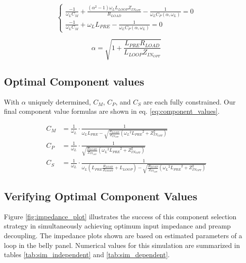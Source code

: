 \begin{equation}\label{eq:syseq}
\begin{cases}
    \frac{-1}{\omega_L C_M} + \frac{(\alpha^2-1) \omega_L L_{LOOP} Z_{IN_{OPT}}}{R_{LOAD}} - \frac{1}{\omega_L
    C_P(\alpha,\omega_L)} = 0\\

    \frac{-1}{\omega_L C_M} + \omega_L L_{PRE} - \frac{1}{\omega_L C_P(\alpha, \omega_L)} = 0 

\end{cases}
\end{equation}

\begin{equation}\label{eq:alpha}
    \alpha = \sqrt{1 + \frac{L_{PRE} R_{LOAD}}{L_{LOOP} Z_{IN_{OPT}}}}
\end{equation}

\subsection{Optimal Component values}
With $\alpha$ uniquely determined, $C_M$, $C_P$, and $C_S$ are each fully constrained. Our final component value formulas
are shown in eq. \ref{eq:component_values}.

\begin{equation}\label{eq:component_values}
\begin{aligned}
        C_M &= \frac{1}{\omega_L} \cdot \frac{1}{\omega_L L_{PRE} - \sqrt{\frac{R_{LOAD}}{Z_{IN_{OPT}}} ({\omega_L}^2 {L_{PRE}}^2 + Z_{IN_{OPT}}^2)}}\\
        C_P &= \frac{1}{\omega_L} \cdot \frac{1}{\sqrt{\frac{R_{LOAD}}{Z_{IN_{OPT}}} ({\omega_L}^2 {L_{PRE}}^2 + Z_{IN_{OPT}}^2)}}\\
        C_S &= \frac{1}{\omega_L} \cdot \frac{1}{\omega_L(L_{PRE} \frac{R_{LOAD}}{Z_{IN{OPT}}} + L_{LOOP}) - \sqrt{\frac{R_{LOAD}}{Z_{IN_{OPT}}} ({\omega_L}^2 {L_{PRE}}^2 + Z_{IN_{OPT}}^2)}}
\end{aligned}
\end{equation}

\subsection{Verifying Optimal Component Values}
Figure \ref{fig:impedance_plot} illustrates the success of this component selection strategy in simultaneously achieving
optimum input impedance and preamp decoupling. The impedance plots shown are based on estimated parameters of a loop in
the belly panel. Numerical values for this simulation are summarized in tables \ref{tab:sim_independent} and
\ref{tab:sim_dependent}.

